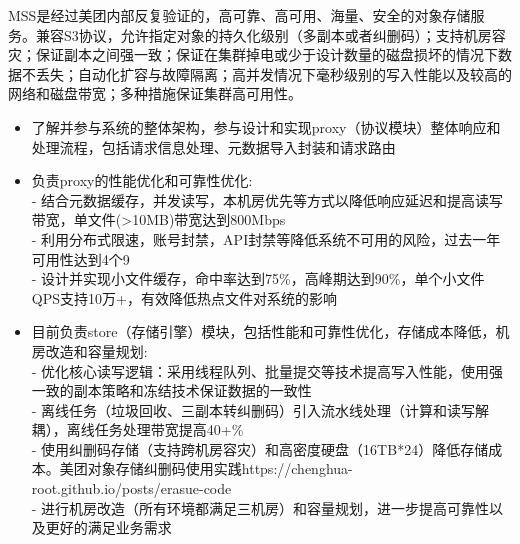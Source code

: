 \documentclass{resume}
\begin{document}
MSS是经过美团内部反复验证的，高可靠、高可用、海量、安全的对象存储服务。兼容S3协议，允许指定对象的持久化级别（多副本或者纠删码）；支持机房容灾；保证副本之间强一致；保证在集群掉电或少于设计数量的磁盘损坏的情况下数据不丢失；自动化扩容与故障隔离；高并发情况下毫秒级别的写入性能以及较高的网络和磁盘带宽；多种措施保证集群高可用性。
\begin{itemize}
  \item 了解并参与系统的整体架构，参与设计和实现proxy（协议模块）整体响应和处理流程，包括请求信息处理、元数据导入封装和请求路由
\end{itemize}
\begin{itemize}
  \item 负责proxy的性能优化和可靠性优化:\\
  - 结合元数据缓存，并发读写，本机房优先等方式以降低响应延迟和提高读写带宽，单文件(>10MB)带宽达到800Mbps\\
  - 利用分布式限速，账号封禁，API封禁等降低系统不可用的风险，过去一年可用性达到4个9\\
  - 设计并实现小文件缓存，命中率达到75\%，高峰期达到90\%，单个小文件QPS支持10万+，有效降低热点文件对系统的影响
\end{itemize}
\begin{itemize}
  \item 目前负责store（存储引擎）模块，包括性能和可靠性优化，存储成本降低，机房改造和容量规划:\\
  - 优化核心读写逻辑：采用线程队列、批量提交等技术提高写入性能，使用强一致的副本策略和冻结技术保证数据的一致性\\
  - 离线任务（垃圾回收、三副本转纠删码）引入流水线处理（计算和读写解耦），离线任务处理带宽提高40+\%\\
  - 使用纠删码存储（支持跨机房容灾）和高密度硬盘（16TB*24）降低存储成本。美团对象存储纠删码使用实践https://chenghua-root.github.io/posts/erasue-code\\
  - 进行机房改造（所有环境都满足三机房）和容量规划，进一步提高可靠性以及更好的满足业务需求
\end{itemize}

\end{document}
